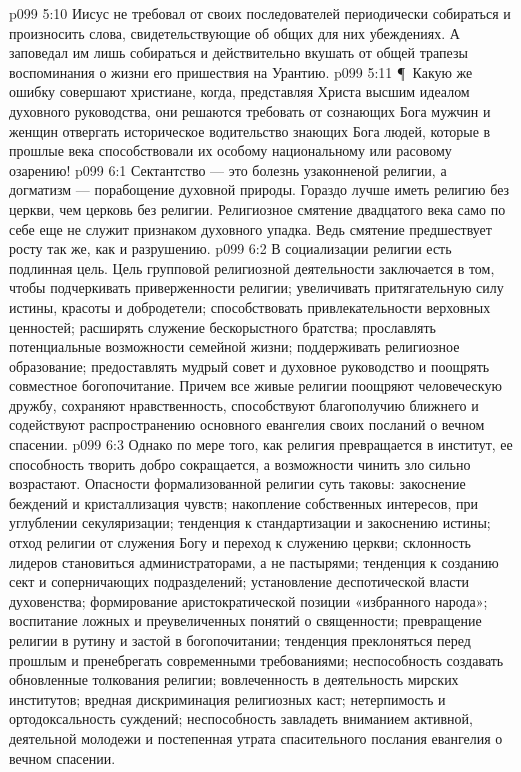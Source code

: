 \vs p099 5:10 Иисус не требовал от своих последователей периодически собираться и произносить слова, свидетельствующие об общих для них убеждениях. А заповедал им лишь собираться и действительно  вкушать от общей трапезы воспоминания о жизни его пришествия на Урантию.
\vs p099 5:11 \P\ Какую же ошибку совершают христиане, когда, представляя Христа высшим идеалом духовного руководства, они решаются требовать от сознающих Бога мужчин и женщин отвергать историческое водительство знающих Бога людей, которые в прошлые века способствовали их особому национальному или расовому озарению!
\vs p099 6:1 Сектантство --- это болезнь узаконненой религии, а догматизм --- порабощение духовной природы. Гораздо лучше иметь религию без церкви, чем церковь без религии. Религиозное смятение двадцатого века само по себе еще не служит признаком духовного упадка. Ведь смятение предшествует росту так же, как и разрушению.
\vs p099 6:2 В социализации религии есть подлинная цель. Цель групповой религиозной деятельности заключается в том, чтобы подчеркивать приверженности религии; увеличивать притягательную силу истины, красоты и добродетели; способствовать привлекательности верховных ценностей; расширять служение бескорыстного братства; прославлять потенциальные возможности семейной жизни; поддерживать религиозное образование; предоставлять мудрый совет и духовное руководство и поощрять совместное богопочитание. Причем все живые религии поощряют человеческую дружбу, сохраняют нравственность, способствуют благополучию ближнего и содействуют распространению основного евангелия своих посланий о вечном спасении.
\vs p099 6:3 Однако по мере того, как религия превращается в институт, ее способность творить добро сокращается, а возможности чинить зло сильно возрастают. Опасности формализованной религии суть таковы: закоснение беждений и кристаллизация чувств; накопление собственных интересов, при углублении секуляризации; тенденция к стандартизации и закоснению истины; отход религии от служения Богу и переход к служению церкви; склонность лидеров становиться администраторами, а не пастырями; тенденция к созданию сект и соперничающих подразделений; установление деспотической власти духовенства; формирование аристократической позиции «избранного народа»; воспитание ложных и преувеличенных понятий о священности; превращение религии в рутину и застой в богопочитании; тенденция преклоняться перед прошлым и пренебрегать современными требованиями; неспособность создавать обновленные толкования религии; вовлеченность в деятельность мирских институтов; вредная дискриминация религиозных каст; нетерпимость и ортодоксальность суждений; неспособность завладеть вниманием активной, деятельной молодежи и постепенная утрата спасительного послания евангелия о вечном спасении.
